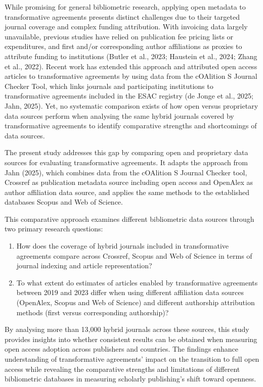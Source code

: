 \documentclass[a4paper,man,floatsintext,longtable,noextraspace,10pt]{apa6}
\begin{document}
While promising for general bibliometric research, applying open
metadata to transformative agreements presents distinct challenges due
to their targeted journal coverage and complex funding attribution. With
invoicing data largely unavailable, previous studies have relied on
publication fee pricing lists or expenditures, and first and/or
corresponding author affiliations as proxies to attribute funding to
institutions (Butler et al., 2023; Haustein et al., 2024; Zhang et al.,
2022). Recent work has extended this approach and attributed open access
articles to transformative agreements by using data from the cOAlition S
Journal Checker Tool, which links journals and participating
institutions to transformative agreements included in the ESAC registry
(de Jonge et al., 2025; Jahn, 2025). Yet, no systematic comparison
exists of how open versus proprietary data sources perform when
analysing the same hybrid journals covered by transformative agreements
to identify comparative strengths and shortcomings of data sources.

The present study addresses this gap by comparing open and proprietary
data sources for evaluating transformative agreements. It adapts the
approach from Jahn (2025), which combines data from the cOAlition S
Journal Checker tool, Crossref as publication metadata source including
open access and OpenAlex as author affiliation data source, and applies
the same methods to the established databases Scopus and Web of Science.

This comparative approach examines different bibliometric data sources
through two primary research questions:

\begin{enumerate}
\def\labelenumi{\arabic{enumi}.}
\item
  How does the coverage of hybrid journals included in transformative
  agreements compare across Crossref, Scopus and Web of Science in terms
  of journal indexing and article representation?
\item
  To what extent do estimates of articles enabled by transformative
  agreements between 2019 and 2023 differ when using different
  affiliation data sources (OpenAlex, Scopus and Web of Science) and
  different authorship attribution methods (first versus corresponding
  authorship)?
\end{enumerate}

By analysing more than 13,000 hybrid journals across these sources, this
study provides insights into whether consistent results can be obtained
when measuring open access adoption across publishers and countries. The
findings enhance understanding of transformative agreements' impact on
the transition to full open access while revealing the comparative
strengths and limitations of different bibliometric databases in
measuring scholarly publishing's shift toward openness.
\end{document}
